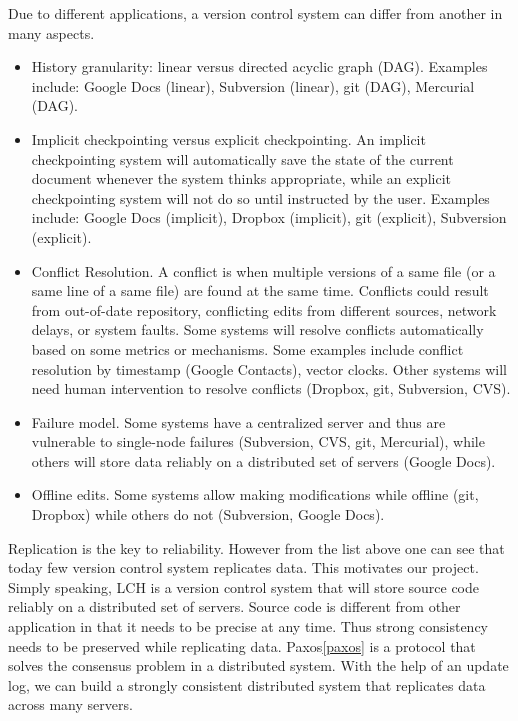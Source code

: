 \documentclass[11pt]{article}
\begin{document}
Due to different applications, a version control system can differ from another in many aspects.
\begin{itemize}
    \item History granularity: linear versus directed acyclic graph (DAG).
        Examples include: Google Docs (linear), Subversion (linear), git (DAG), Mercurial (DAG).
    \item Implicit checkpointing versus explicit checkpointing.
        An implicit checkpointing system will automatically save the state of the current document whenever the system thinks appropriate, while an explicit checkpointing system will not do so until instructed by the user.
        Examples include: Google Docs (implicit), Dropbox (implicit), git (explicit), Subversion (explicit).
    \item Conflict Resolution.
        A conflict is when multiple versions of a same file (or a same line of a same file) are found at the same time.
        Conflicts could result from out-of-date repository, conflicting edits from different sources, network delays, or system faults.
        Some systems will resolve conflicts automatically based on some metrics or mechanisms.
        Some examples include conflict resolution by timestamp (Google Contacts), vector clocks.
        Other systems will need human intervention to resolve conflicts (Dropbox, git, Subversion, CVS).
    \item Failure model.
        Some systems have a centralized server and thus are vulnerable to single-node failures (Subversion, CVS, git, Mercurial\footnotemark),
        while others will store data reliably on a distributed set of servers (Google Docs).
    \item Offline edits.
        Some systems allow making modifications while offline (git, Dropbox) while others do not (Subversion, Google Docs).
\end{itemize}

Replication is the key to reliability.
However from the list above one can see that today few version control system replicates data.
This motivates our project.
Simply speaking, LCH is a version control system that will store source code reliably on a distributed set of servers.
Source code is different from other application in that it needs to be precise at any time.
Thus strong consistency needs to be preserved while replicating data.
Paxos\ref{paxos} is a protocol that solves the consensus problem in a distributed system.
With the help of an update log, we can build a strongly consistent distributed system that replicates data across many servers.
\end{document}
